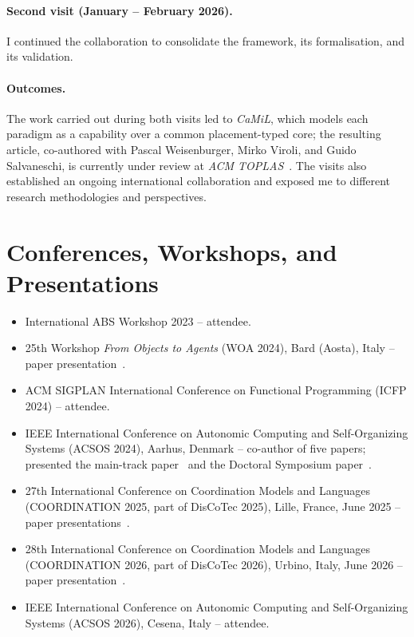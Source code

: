 \documentclass[a4paper,11pt]{article}
\begin{document}
\paragraph{Second visit (January -- February 2026).}
I continued the collaboration to consolidate the framework, its formalisation, and its validation.

\paragraph{Outcomes.}
The work carried out during both visits led to \emph{CaMiL}, which models each paradigm as a capability over a common placement-typed core;
the resulting article, co-authored with Pascal Weisenburger, Mirko Viroli, and Guido Salvaneschi, is currently under review at \emph{ACM TOPLAS}~\cite{farabegoli2026capabilities}.
%
The visits also established an ongoing international collaboration and exposed me to different research methodologies and perspectives.

\section{Conferences, Workshops, and Presentations}
\label{sec:conferences}

\begin{itemize}
  \item International ABS Workshop 2023 -- attendee.
  \item 25th Workshop \emph{From Objects to Agents} (WOA 2024), Bard (Aosta), Italy -- paper presentation~\cite{DBLP:conf/woa/DominiFAV24}.
  \item ACM SIGPLAN International Conference on Functional Programming (ICFP 2024) -- attendee.
  \item IEEE International Conference on Autonomic Computing and Self-Organizing Systems (ACSOS 2024), Aarhus, Denmark -- co-author of five papers; presented the main-track paper~\cite{DBLP:conf/acsos/FarabegoliVC24} and the Doctoral Symposium paper~\cite{DBLP:conf/acsos/Farabegoli24}.
  \item 27th International Conference on Coordination Models and Languages (COORDINATION 2025, part of DisCoTec 2025), Lille, France, June 2025 -- paper presentations~\cite{DBLP:conf/coordination/BrogiCFFV25,DBLP:conf/coordination/AguzziBBCCDFPV25}.
  \item 28th International Conference on Coordination Models and Languages (COORDINATION 2026, part of DisCoTec 2026), Urbino, Italy, June 2026 -- paper presentation~\cite{DBLP:conf/coordination/FarabegoliTAV26}.
  \item IEEE International Conference on Autonomic Computing and Self-Organizing Systems (ACSOS 2026), Cesena, Italy -- attendee.
\end{itemize}
\end{document}
